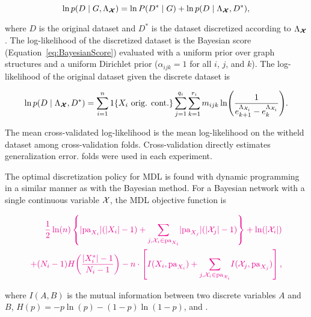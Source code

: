 \begin{equation}
\ln p(D\mid G, \Lambda_{\bm{\mathcal{X}}}) = \ln P(D^*\mid G) + \ln p(D\mid \Lambda_{\bm{\mathcal{X}}}, D^*)\text{,}
\end{equation}

\noindent
where $D$ is the original dataset and $D^*$ is the dataset discretized according to $\Lambda_{\bm{\mathcal{X}}}$.
The log-likelihood of the discretized dataset is the Bayesian score (Equation~\ref{eq:BayesianScore}) evaluated with a uniform prior over graph structures and a uniform Dirichlet prior ($\alpha_{ijk} = 1$ for all $i$, $j$, and $k$).
The log-likelihood of the original dataset given the discrete dataset is

\begin{equation}
  \ln p\paren{D\mid \discset, D^*} = \sum_{i=1}^n
  1\curly{X_i \text{ orig. cont.}}
  \sum_{j=1}^{q_i} \sum_{k=1}^{r_i} m_{ijk} \ln\paren{
    \frac{
      1
    }{
      e^{\Lambda_{\cX_i}}_{k+1} - e^{\Lambda_{\cX_i}}_{k}
    }
  }\text{.}
\end{equation}

\noindent
The mean cross-validated log-likelihood is the mean log-likelihood on the witheld dataset among cross-validation folds.
Cross-validation directly estimates generalization error.
 folds were used in each experiment.

The optimal discretization policy for MDL is found with dynamic programming in a similar manner as with the Bayesian method.
For a Bayesian network with a single continuous variable $\mathcal{X}$, the MDL objective function is

\begin{equation}
  \label{eqn:MDL}
  \todo{
  \begin{aligned}
  \frac{1}{2} \ln(n) \left\lbrace  \lvert \Pa_{X_i} \rvert (\lvert X_i \rvert - 1) +
   {\sum_{j,\cX_i \in \Pa_{X_i}}} \lvert \Pa_{X_j} \rvert (\lvert \cX_j \rvert - 1) \right\rbrace + \ln(\lvert {\cX_i} \rvert) \\
   + (N_i-1) H \paren{\frac{|X^*_i| - 1}{N_i -1}} -n \cdot \left[ I(X_i,\Pa_{X_i}) + {\sum_{j,\cX_i \in \Pa_{\cX_i}}} I(\cX_j, \Pa_{X_j}) \right]\text{,}
  \end{aligned}
  }
\end{equation}

where $I(A,B)$ is the mutual information between two discrete variables $A$ and $B$, ${H(p) = -p \ln(p) - (1-p) \ln(1-p)}$, and .


